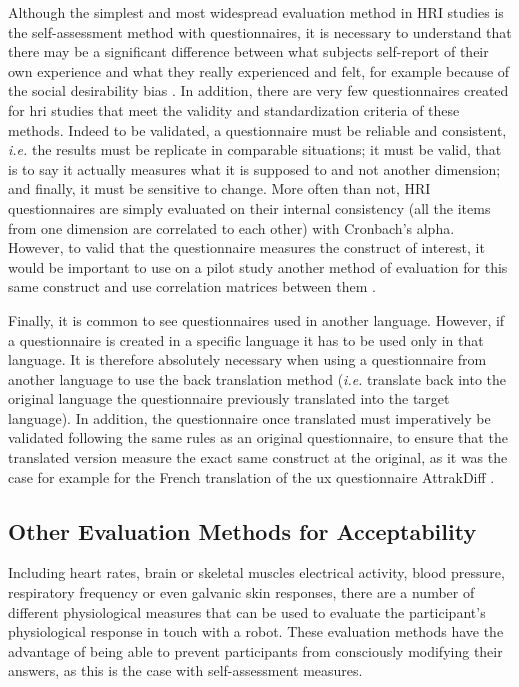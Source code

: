 \documentclass[a4paper,11pt,twoside]{StyleThese}
\begin{document}
Although the simplest and most widespread evaluation method in HRI studies is the self-assessment method with questionnaires, it is necessary to understand that there may be a significant difference between what subjects self-report of their own experience and what they really experienced and felt, for example because of the social desirability bias \cite{fisher1993social}. In addition, there are very few questionnaires created for \acrshort{hri} studies that meet the validity and standardization criteria of these methods. Indeed to be validated, a questionnaire must be reliable and consistent, \textit{i.e.} the results must be replicate in comparable situations; it must be valid, that is to say it actually measures what it is supposed to and not another dimension; and finally, it must be sensitive to change. More often than not, HRI questionnaires are simply evaluated on their internal consistency (all the items from one dimension are correlated to each other) with Cronbach's alpha. However, to valid that the questionnaire measures the construct of interest, it would be important to use on a pilot study another method of evaluation for this same construct and use correlation matrices between them \cite{tsang2017guidelines}. 

Finally, it is common to see questionnaires used in another language. However, if a questionnaire is created in a specific language it has to be used only in that language. It is therefore absolutely necessary when using a questionnaire from another language to use the back translation method (\textit{i.e.} translate back into the original language the questionnaire previously translated into the target language). In addition, the questionnaire once translated must imperatively be validated following the same rules as an original questionnaire, to ensure that the translated version measure the exact same construct at the original, as it was the case for example for the French translation of the \acrshort{ux} questionnaire AttrakDiff \cite{lallemand_creation_2015}.

\subsection{Other Evaluation Methods for Acceptability}

Including heart rates, brain or skeletal muscles electrical activity, blood pressure, respiratory frequency or even galvanic skin responses, there are a number of different physiological measures that can be used to evaluate the participant's physiological response in touch with a robot. These evaluation methods have the advantage of being able to prevent participants from consciously modifying their answers, as this is the case with self-assessment measures.
\end{document}
